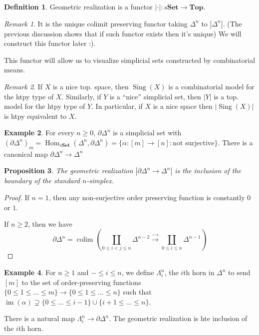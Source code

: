 \documentclass{article}
\theoremstyle{definition}
\newtheorem{defn}{Definition}[section]
\newtheorem{example}[defn]{Example}
\theoremstyle{remark}
\newtheorem{rem}{Remark}
\theoremstyle{plain}
\newtheorem{prop}[defn]{Proposition}
\newcommand{\Hom}{\operatorname{Hom}}
\newcommand{\im}{\operatorname{im}}
\newcommand{\btop}{\mathbf{Top}}
\newcommand{\sing}{\operatorname{Sing}}
\newcommand{\bset}{\mathbf{Set}}
\begin{document}
\begin{defn}
    Geometric realization is a functor $|\cdot |:s\bset\to\btop$.
\end{defn}
\begin{rem}
    It is the unique colimit preserving functor taking $\Delta^n$ to $|\Delta^n|$. (The previous discussion shows that if such functor exists then it's unique) We will construct this functor later :).
\end{rem}
This functor will allow us to visualize simplicial sets constructed by combinatorial means.
\begin{rem}
    If $X$ is a nice top. space, then $\sing(X)$ is a combinatorial model for the htpy type of $X$.
    Similarly, if $Y$ is a ``nice'' simplicial set, then $|Y|$ is a top. model for the htpy type of $Y$. In particular, if $X$ is a nice space then $|\sing(X)|$ is htpy equivalent to $X$.
\end{rem}
\begin{example}
    For every $n\ge0$, $\partial\Delta^n$ is a simplicial set with $(\partial \Delta^n)_m=\Hom_{s\bset}(\Delta^n,\partial\Delta^n)=\{\alpha:[m]\to[n]:\text{not surjective}\}$. There is a canonical map $\partial\Delta^n\to\Delta^n$
\end{example}
\begin{prop}
    The geometric realization $|\partial\Delta^n\to\Delta^n|$ is the inclusion of the boundary of the standard $n$-simplex.
\end{prop}
\begin{proof}
    If $n=1$, then any non-surjective order preserving function is constantly $0$ or $1$.

    If $n\ge 2$, then we have
    \[\partial \Delta^n=\operatorname{colim}\left(\coprod_{0\le i<j\le n}\Delta^{n-2}\overset{\rightarrow}{\rightarrow}\coprod_{0\le i\le n}\Delta^{n-1}\right)\]
\end{proof}
\begin{example}
    For $n\ge1$ and $-\le i\le n$, we define $\Lambda_i^n$, the $i$th horn in $\Delta^n$ to send $[m]$ to the set of order-preserving functions $\{0\le1\le...\le m\}\to\{0\le 1\le...\le n\}$ such that $\im(\alpha)\supsetneq\{0\le...\le i-1\}\cup\{i+1\le...\le n\}$.
    
    There is a natural map $\Lambda_i^n\to\partial\Delta^n$. The geometric realization is hte inclusion of the $i$th horn.
\end{example}
\end{document}
